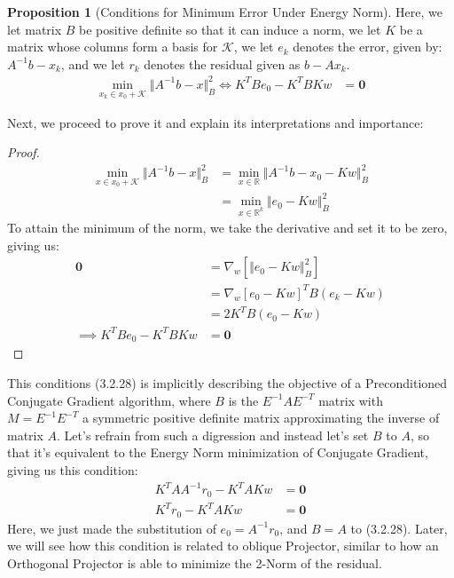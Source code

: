 \documentclass[]{article}
\theoremstyle{definition}
\newtheorem{prop}{Proposition}[section]  %
\begin{document}
            \begin{prop}[Conditions for Minimum Error Under Energy Norm]
                Here, we let matrix $B$ be positive definite so that it can induce a norm, we let $K$ be a matrix whose columns form a basis for $\mathcal K$, we let $e_k$ denotes the error, given by: $A^{-1}b - x_k$, and we let $r_k$ denotes the residual given as $b - Ax_k$. 
                \begin{align}
                    \min_{x_k\in x_0 + \mathcal K}\Vert A^{-1}b - x\Vert_B^2
                    \iff
                    K^TBe_0 - K^TBKw &= \mathbf 0
                \end{align} 
            \end{prop}
            Next, we proceed to prove it and explain its interpretations and importance: 
            \begin{proof}
                \begin{align}
                    \min_{x \in x_0 + \mathcal K}
                    \Vert A^{-1}b - x\Vert_B^2
                    &= 
                    \min_{x\in \mathbb R} 
                    \Vert A^{-1}b - x_0 - Kw\Vert_B^2
                    \\
                    &= \min_{x\in \mathbb R^k}
                    \Vert e_0 - Kw\Vert_B^2
                \end{align}
                To attain the minimum of the norm, we take the derivative and set it to be zero, giving us: 
                \begin{align}
                    \mathbf 0 &= \nabla_w[\Vert e_0 - Kw\Vert_B^2]
                    \\
                    &= \nabla_w[e_0 - Kw]^TB(e_k - Kw)
                    \\
                    &= 2K^TB(e_0 - Kw)
                    \\
                    \implies 
                    K^TBe_0 - K^TBKw &= \mathbf 0
                \end{align}
            \end{proof}
            This conditions (3.2.28) is implicitly describing the objective of a Preconditioned Conjugate Gradient algorithm, where $B$ is the $E^{-1}AE^{-T}$ matrix with $M = E^{-1}E^{-T}$ a symmetric positive definite matrix approximating the inverse of matrix $A$. Let's refrain from such a digression and instead let's set $B$ to $A$, so that it's equivalent to the Energy Norm minimization of Conjugate Gradient, giving us this condition: 
            \begin{align}
                K^TAA^{-1}r_0 - K^TAKw &= \mathbf 0
                \\
                K^Tr_0 - K^TAKw &= \mathbf 0
            \end{align}
            Here, we just made the substitution of $e_0 = A^{-1}r_0$, and $B = A$ to (3.2.28). Later, we will see how this condition is related to oblique Projector, similar to how an Orthogonal Projector is able to minimize the 2-Norm of the residual. 
\end{document}
